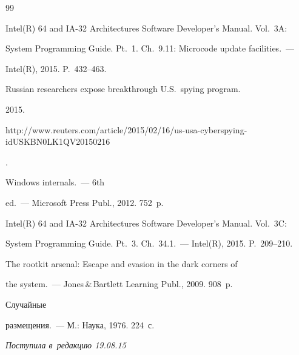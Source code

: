 {{\begin{thebibliography}{99}


  Intel(R) 64 and IA-32 Architectures Software Developer's Manual. Vol.~3A: 


System Programming Guide. Pt.~1. Ch.~9.11: Microcode update facilities.~--- 


Intel(R), 2015. P.~432--463. 




   Russian researchers expose breakthrough U.S.\ spying program. 


2015. {\sf 


  http://www.reuters.com/article/2015/02/16/us-usa-cyberspying-idUSKBN0LK1QV20150216}. 




   Windows internals.~--- 6th 


ed.~--- Microsoft Press Publ., 2012. 752~p.




  Intel(R) 64 and IA-32 Architectures Software Developer's Manual. Vol.~3C: 


System Programming Guide. Pt.~3. Ch.~34.1.~--- Intel(R), 2015. P.~209--210.





\pagebreak







   The rootkit arsenal: Escape and evasion in the dark corners of 


the system.~--- Jones\,\&\,Bartlett Learning Publ., 2009. 908~p.




   Случайные 


размещения.~--- М.: Наука, 1976. 224~с.


\end{thebibliography}


} }








\vspace*{-6pt}





\hfill{\small\textit{Поступила в~редакцию 19.08.15}}














